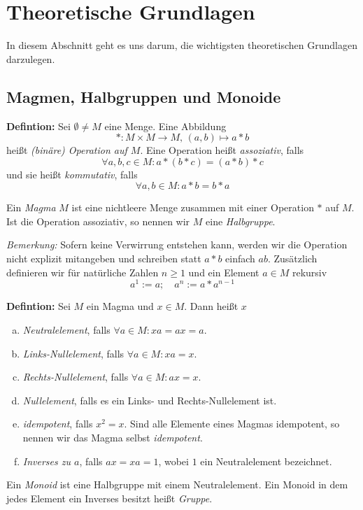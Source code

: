 \documentclass[a4paper, halfparskip*]{scrartcl}
\begin{document}
\section{Theoretische Grundlagen}
\label{sec:tg}
In diesem Abschnitt geht es uns darum, die wichtigsten theoretischen Grundlagen
darzulegen.

\subsection{Magmen, Halbgruppen und Monoide}
\label{sec:tg:monoide}
\textbf{Defintion:} Sei $\emptyset \neq M$ eine Menge. Eine Abbildung
\begin{equation*}
  * \colon M \times M \to M,\, (a,b) \mapsto a*b
\end{equation*}
heißt \emph{(binäre) Operation auf $M$}. Eine Operation heißt \emph{assoziativ}, falls
\begin{equation*}
  \forall a,b,c\in M \colon a*(b*c) = (a*b)*c
\end{equation*}
und sie heißt \emph{kommutativ}, falls
\begin{equation*}
  \forall a,b\in M \colon a*b = b*a
\end{equation*}

Ein \emph{Magma} $M$ ist eine nichtleere Menge zusammen mit einer Operation $*$
auf $M$. Ist die Operation assoziativ, so nennen wir $M$ eine \emph{Halbgruppe}.

\textit{Bemerkung:} Sofern keine Verwirrung entstehen kann, werden wir die
Operation nicht explizit mitangeben und schreiben statt $a*b$ einfach
$ab$. Zusätzlich definieren wir für natürliche Zahlen $n\geq 1$ und ein Element
$a\in M$ rekursiv
\begin{equation*}
  a^1 := a;\quad a^n := a*a^{n-1}
\end{equation*}


\textbf{Defintion:} Sei $M$ ein Magma und $x\in M$. Dann heißt $x$
\begin{enumerate}[(a)]
\item \emph{Neutralelement}, falls $\forall a\in M\colon xa = ax = a$.
\item \emph{Links-Nullelement}, falls $\forall a\in M\colon xa = x$.
\item \emph{Rechts-Nullelement}, falls $\forall a\in M\colon ax = x$.
\item \emph{Nullelement}, falls es ein Links- und Rechts-Nullelement ist.
\item \emph{idempotent}, falls $x^2 = x$. Sind alle Elemente eines Magmas
  idempotent, so nennen wir das Magma selbst \emph{idempotent}.
\item \emph{Inverses zu $a$}, falls $ax = xa = 1$, wobei $1$ ein Neutralelement
  bezeichnet.
\end{enumerate}
Ein \emph{Monoid} ist eine Halbgruppe mit einem Neutralelement. Ein Monoid in
dem jedes Element ein Inverses besitzt heißt \emph{Gruppe}.
\end{document}
